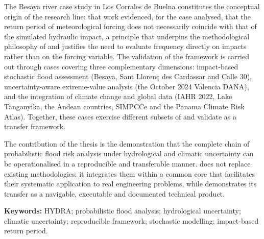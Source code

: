 The Besaya river case study in Los Corrales de Buelna constitutes the conceptual origin of the research line: that work evidenced, for the case analysed, that the return period of meteorological forcing does not necessarily coincide with that of the simulated hydraulic impact, a principle that underpins the methodological philosophy of \hydra and justifies the need to evaluate frequency directly on impacts rather than on the forcing variable. The validation of the framework is carried out through cases covering three complementary dimensions: impact-based stochastic flood assessment (Besaya, Sant Llorenç des Cardassar and Calle 30), uncertainty-aware extreme-value analysis (the October 2024 Valencia DANA), and the integration of climate change and global data (IAHR 2022, Lake Tanganyika, the Andean countries, SIMPCCe and the Panama Climate Risk Atlas). Together, these cases exercise different subsets of \pyhydra and validate \hydra as a transfer framework.

The contribution of the thesis is the demonstration that the complete chain of probabilistic flood risk analysis under hydrological and climatic uncertainty can be operationalised in a reproducible and transferable manner. \pyhydra does not replace existing methodologies; it integrates them within a common core that facilitates their systematic application to real engineering problems, while \hydra demonstrates its transfer as a navigable, executable and documented technical product.

\textbf{Keywords:} HYDRA; probabilistic flood analysis; hydrological uncertainty; climatic uncertainty; reproducible framework; stochastic modelling; impact-based return period.
